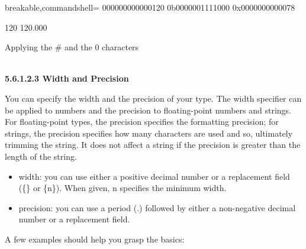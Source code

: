 \begin{tcblisting}{breakable,commandshell={}}
000000000000120
0b0000001111000
0x0000000000078

120
120.000
\end{tcblisting}

\begin{center}
Applying the \# and the 0 characters
\end{center}

\hspace*{\fill} \\ %
\noindent
\textbf{5.6.1.2.3\hspace{0.2cm} Width and Precision}

You can specify the width and the precision of your type. The width specifier can be applied to numbers and the precision to floating-point numbers and strings. For floating-point types, the precision specifies the formatting precision; for strings, the precision specifies how many characters are used and so, ultimately trimming the string. It does not affect a string if the precision is greater than the length of the string.

\begin{itemize}
\item 
width: you can use either a positive decimal number or a replacement field (\{\} or \{n\}). When given, n specifies the minimum width.

\item 
precision: you can use a period (.) followed by either a non-negative decimal number or a replacement field.
\end{itemize}

A few examples should help you grasp the basics:

